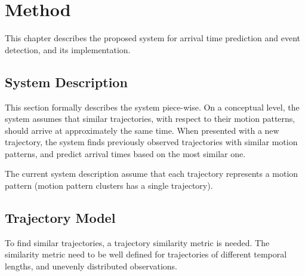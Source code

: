 \chapter{Method}
\label{cha:method}
This chapter describes the proposed system for arrival time prediction
and event detection, and its implementation.

\section{System Description}
This section formally describes the system piece-wise. On a conceptual
level, the system assumes that similar trajectories, with respect to their motion patterns, should arrive at
approximately the same time. When presented with a new trajectory, the system
finds previously observed trajectories with similar motion patterns,
and predict arrival times based on the most similar one. 

The current system description assume that each trajectory represents
a motion pattern (motion pattern clusters has a single trajectory).

\section{Trajectory Model}
To find similar trajectories, a trajectory similarity metric 
is needed. The similarity metric need to be well defined for
trajectories of different temporal lengths, and unevenly
distributed observations.

